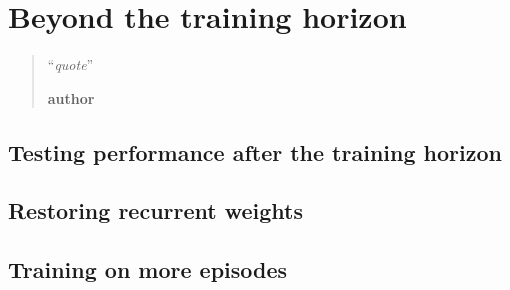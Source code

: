 \chapter{Beyond the training horizon}
\begin{quotation}
\noindent ``\emph{quote}''
\begin{flushright}\textbf{author}\end{flushright}
\end{quotation}


\section{Testing performance after the training horizon}

\section{Restoring recurrent weights}

\section{Training on more episodes}

